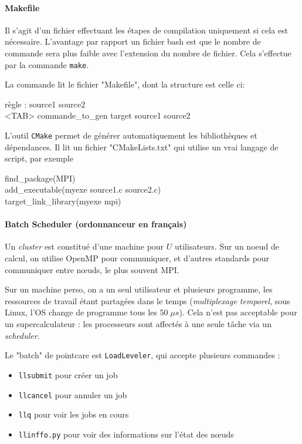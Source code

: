 \documentclass{article}
\begin{document}
\paragraph{Makefile}
Il s'agit d'un fichier effectuant les étapes de compilation uniquement si cela est nécessaire. L'avantage par rapport  un fichier bash est que le nombre de commande sera plus faible avec l'extension du nombre de fichier. Cela s'effectue par la commande \texttt{make}.

La commande lit le fichier "Makefile", dont la structure est celle ci:\\
\begin{algorithm}[H]
règle : source1 source2\\
<TAB> commande\_to\_gen target source1 source2\\
\end{algorithm}
L'outil \texttt{CMake} permet de générer automatiquement les bibliothèques et dépendances. Il lit un fichier "CMakeLists.txt" qui utilise un vrai langage de script, par exemple\\
\begin{algorithm}[H]
find\_package(MPI)\\
add\_executable(myexe source1.c source2.c)\\
target\_link\_library(myexe mpi)\\
\end{algorithm}

\paragraph{Batch Scheduler (ordonnanceur en français)}
Un \emph{cluster} est constitué d'une machine pour $U$ utilisateurs. Sur un noeud de calcul, on utilise OpenMP pour communiquer, et d'autres standards pour communiquer entre nœuds, le plus souvent MPI.

Sur un machine perso, on a un seul utilisateur et plusieurs programme, les ressources de travail étant partagées dans le temps (\emph{multiplexage temporel}, sous Linux, l'OS change de programme tous les $50\; \mu s$). Cela n'est pas acceptable pour un supercalculateur : les processeurs sont affectés à une seule tâche via un \emph{scheduler}.

Le "batch" de pointcare est \texttt{LoadLeveler}, qui accepte plusieurs commandes :
\begin{itemize}[label=\textbullet]
\item \texttt{llsubmit} pour créer un job
\item \texttt{llcancel} pour annuler un job
\item \texttt{llq} pour voir les jobs en cours
\item \texttt{llinffo.py} pour voir des informations sur l'état des nœuds
\end{itemize}
\end{document}
